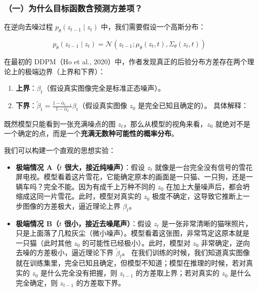 \hypertarget{ux4e00ux4e3aux4ec0ux4e48ux76eeux6807ux51fdux6570ux542bux9884ux6d4bux65b9ux5deeux9879}{%
\subsubsection{（一）为什么目标函数含预测方差项？}\label{ux4e00ux4e3aux4ec0ux4e48ux76eeux6807ux51fdux6570ux542bux9884ux6d4bux65b9ux5deeux9879}}

在逆向去噪过程 \(p_\theta(z_{t-1}\mid z_t)\) 中，我们需要假设一个高斯分布：

\[
p_\theta(z_{t-1}\mid z_t)=\mathcal{N}(z_{t-1};\mu_\theta(z_t,t),\Sigma_\theta(z_t,t))
\]

在最初的 DDPM（Ho et al., 2020）中，作者发现真正的后验分布方差存在两个理论上的极端边界（上界和下界）：

\begin{enumerate}
\def\labelenumi{\arabic{enumi}.}
\tightlist
\item
  \textbf{上界}：\(\beta_t\)（假设真实图像完全是标准正态噪声）。
\item
  \textbf{下界}：\(\tilde{\beta}_t=\frac{1-\bar{\alpha}_{t-1}}{1-\bar{\alpha}_t}\beta_t\)（假设真实图像 \(z_0\) 是完全已知且确定的）。
  具体解释：
\end{enumerate}

既然模型只能看到一张充满噪点的图 \(z_t\)，那么从模型的视角来看，\(z_0\) 就绝对不是一个确定的点，而是一个\textbf{充满无数种可能性的概率分布}。

我们可以构建一个直观的思想实验：

\begin{itemize}
\tightlist
\item
  \textbf{极端情况 A（\(t\) 很大，接近纯噪声）}：假设 \(z_t\) 就像是一台完全没有信号的雪花屏电视。模型看着这片雪花，它能确定原本的画面是一只猫、一只狗，还是一辆车吗？完全不能。因为有成千上万种不同的 \(z_0\) 在加上大量噪声后，都会坍缩成这同一片雪花。此时，模型对真实的 \(z_0\) 极度不确定，这导致它推断上一步图像的方差极大，逼近理论上界 \(\beta_t\)。
\item
  \textbf{极端情况 B（\(t\) 很小，接近去噪尾声）}：假设 \(z_t\) 是一张非常清晰的猫咪照片，只是上面落了几粒灰尘（微小噪声）。模型看着这张图，非常笃定这原本就是一只猫（此时其他 \(z_0\) 的可能性已经极小）。此时，模型对 \(z_0\) 非常确定，逆向去噪的方差极小，逼近理论下界 \(\tilde{\beta}_t\)。
  在我们训练的时候，我们知道真实图像就在训练集里，完全已知且确定，但模型不知道；模型在推理的时候，若对真实的 \(z_0\) 是什么完全没有把握，则 \(z_{t-1}\) 的方差取上界；若对真实的 \(z_0\) 是什么完全确定，则 \(z_{t-1}\) 的方差取下界。
\end{itemize}


